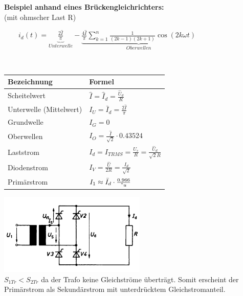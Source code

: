 	\begin{minipage}[c]{8cm} 
	   \textbf{Beispiel anhand eines Brückengleichrichters:}	  	\\
	   (mit ohmscher Last R)
	\end{minipage}   
	\begin{minipage}[c]{10cm} 	
	   $ \qquad i_d(t) = \underbrace{\frac{2 \hat{I}}{\pi}}_{Unterwelle} - \underbrace{\frac{4\hat{I}}{\pi} \sum\limits_{k=1}^n \frac{1}{(2k-1)(2k+1)} \cos(2k\omega t)}_{Oberwellen} $
	\end{minipage}\\
\begin{minipage}[c]{10cm}  
		\begin{tabular}{| l | l |}
    		\hline 
      		\textbf{Bezeichnung}
      		& \textbf{Formel} \\
      		\hline
      		Scheitelwert 
      		& $\hat{I} = \hat{I}_d = \frac{\hat{U}_d}{R} $ \\
      		Unterwelle (Mittelwert)
      		& $I_U = \bar{I}_d = \frac{2 \hat{I}}{\pi}$ \\
      		Grundwelle
      		& $I_G = 0$ \\
      		Oberwellen
      		& $I_O = \frac{\hat{I}}{\sqrt{2}} \cdot 0.43524$ \\
      		Laststrom
      		& $I_{d} = I_{TRMS} =  \frac{U_s}{R}= \frac{\hat{U}_d}{\sqrt{2}R}$ \\ 
      		Diodenstrom
      		& $I_{V} = \frac{\hat{U}}{2 R} = \frac{I_{d}}{\sqrt{2}}$ \\
      		Prim\"arstrom
      		& $I_1 \approx \bar{I}_d \cdot \frac{0.966}{"u}$ \\
      	 	\hline
    	\end{tabular}
	\end{minipage}   
	\begin{minipage}[c]{8cm}  
			\includegraphics[width=7cm]{bilder/brueckengleichrichter.png}  \\			
	$S_{1Tr} < S_{2Tr}$ da der Trafo keine Gleichstr\"ome übertr\"agt. Somit erscheint der Prim\"arstrom
	als Sekund\"arstrom mit unterdrücktem Gleichstromanteil.			
	\end{minipage}
